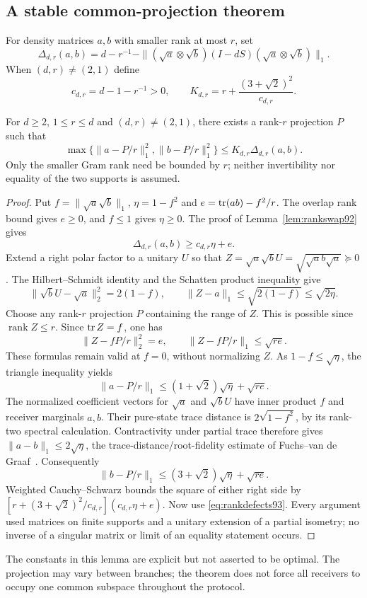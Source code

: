 \subsection{A stable common-projection theorem}
For density matrices $a,b$ with smaller rank at most $r$, set
\[
 \Delta_{d,r}(a,b)=d-r^{-1}
  -\|(\sqrt a\otimes\sqrt b)(I-dS)(\sqrt a\otimes\sqrt b)\|_1.
\]
When $(d,r)\ne(2,1)$ define
\begin{equation}\label{eq:rankrigidityconstant93}
 c_{d,r}=d-1-r^{-1}>0,\qquad
 K_{d,r}=r+\frac{(3+\sqrt2)^2}{c_{d,r}}.
\end{equation}
\begin{lemma}\label{lem:projectionstability93}
For $d\ge2$, $1\le r\le d$ and $(d,r)\ne(2,1)$, there exists
a rank-$r$ projection $P$ such that
\begin{equation}\label{eq:projectionstability93}
 \max\{\|a-P/r\|_1^2,\|b-P/r\|_1^2\}
       \le K_{d,r}\Delta_{d,r}(a,b).
\end{equation}
Only the smaller Gram rank need be bounded by $r$; neither
invertibility nor equality of the two supports is assumed.
\end{lemma}
\begin{proof}
Put $f=\|\sqrt a\sqrt b\|_1$, $\eta=1-f^2$ and
$e=\operatorname{tr}(ab)-f^2/r$.  The overlap rank bound gives $e\ge0$, and
$f\le1$ gives $\eta\ge0$.  The proof of
Lemma~\ref{lem:rankswap92} gives
\begin{equation}\label{eq:rankdefects93}
              \Delta_{d,r}(a,b)\ge c_{d,r}\eta+e.
\end{equation}
Extend a right polar factor to a unitary $U$ so that
$Z=\sqrt a\sqrt bU=\sqrt{\sqrt a b\sqrt a}\succeq0$.
The Hilbert--Schmidt identity and the Schatten product inequality give
\[
 \|\sqrt bU-\sqrt a\|_2^2=2(1-f),\qquad
 \|Z-a\|_1\le\sqrt{2(1-f)}\le\sqrt{2\eta}.
\]
Choose any rank-$r$ projection $P$ containing the range of $Z$.
This is possible since $\operatorname{rank}Z\le r$.  Since
$\operatorname{tr} Z=f$, one has
\[
 \|Z-fP/r\|_2^2=e,\qquad
 \|Z-fP/r\|_1\le\sqrt{re}.
\]
These formulas remain valid at $f=0$, without normalizing $Z$.
As $1-f\le\sqrt\eta$, the triangle inequality yields
\[
       \|a-P/r\|_1\le(1+\sqrt2)\sqrt\eta+\sqrt{re}.
\]
The normalized coefficient vectors for $\sqrt a$ and $\sqrt bU$
have inner product $f$ and receiver marginals $a,b$.
Their pure-state trace distance is $2\sqrt{1-f^2}$, by its
rank-two spectral calculation.  Contractivity under partial trace
therefore gives $\|a-b\|_1\le2\sqrt\eta$, the trace-distance/root-fidelity estimate of
Fuchs--van de Graaf~\cite[Theorem~1]{FvdG93}.  Consequently
\[
       \|b-P/r\|_1\le(3+\sqrt2)\sqrt\eta+\sqrt{re}.
\]
Weighted Cauchy--Schwarz bounds the square of either right side by
$[r+(3+\sqrt2)^2/c_{d,r}](c_{d,r}\eta+e)$.
Now use \eqref{eq:rankdefects93}.  Every argument used matrices on
finite supports and a unitary extension of a partial isometry; no
inverse of a singular matrix or limit of an equality statement occurs.
\end{proof}
The constants in this lemma are explicit but not asserted to be optimal.
The projection may vary between branches; the theorem does not force
all receivers to occupy one common subspace throughout the protocol.

